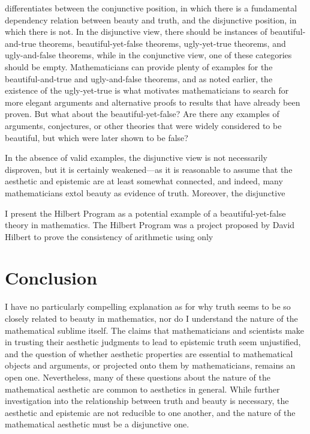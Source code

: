 \documentclass[a4paper,man,natbib]{apa6}
\begin{document}
\cite{todd_unmasking_2008} differentiates between the conjunctive position, in which there is a fundamental dependency
relation between beauty and truth, and the disjunctive position, in which there is not. 
In the disjunctive view, there should be 
instances of beautiful-and-true theorems, beautiful-yet-false theorems, ugly-yet-true theorems, and ugly-and-false theorems,
while in the conjunctive view, one of these categories should be empty. 
Mathematicians can provide plenty of examples for the beautiful-and-true \citep{aigner1999proofs} and
ugly-and-false theorems, and as noted earlier, the existence of the ugly-yet-true is what motivates mathematicians
to search for more elegant arguments and alternative proofs to results that have already been proven. But what about
the beautiful-yet-false? Are there any examples of arguments, conjectures, or other theories that were widely considered 
to be beautiful, but which were later shown to be false?

In the absence of valid examples, the disjunctive view is not necessarily disproven, but it is certainly weakened---as
it is reasonable to assume that the aesthetic and epistemic are at least somewhat connected, and indeed, many 
mathematicians extol beauty as evidence of truth. Moreover, the disjunctive 

I present the Hilbert Program \citep{sep-hilbert-program} as a potential example of a beautiful-yet-false theory in
mathematics. The Hilbert Program was a project proposed by David Hilbert to prove the consistency of arithmetic using only

\section{Conclusion}

I have no particularly compelling explanation as for why truth seems to be so closely related to beauty in mathematics,
nor do I understand the nature of the mathematical sublime itself. The claims that mathematicians and scientists make
in trusting their aesthetic judgments to lead to epistemic truth seem unjustified, and the question of whether
aesthetic properties are essential to mathematical objects and arguments, or projected onto them by mathematicians,
remains an open one. Nevertheless, many of these questions about the nature of the mathematical aesthetic are
common to aesthetics in general. While further investigation into the relationship between truth and beauty is
necessary, the aesthetic and epistemic are not reducible to one another, and the nature of the mathematical
aesthetic must be a disjunctive one.
\end{document}
